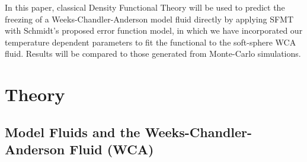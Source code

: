 \documentclass[double,12pt]{beavtex}
\begin{document}
In this paper, classical Density Functional Theory will be used to predict 
the freezing of a Weeks-Chandler-Anderson model fluid directly by applying 
SFMT with Schmidt's proposed error function model, 
in which we have incorporated our temperature dependent parameters to 
fit the functional to the soft-sphere WCA fluid. 
Results will be compared to those generated from Monte-Carlo simulations.



\chapter{Theory}

\section{Model Fluids and the Weeks-Chandler-Anderson Fluid (WCA)}
\end{document}
